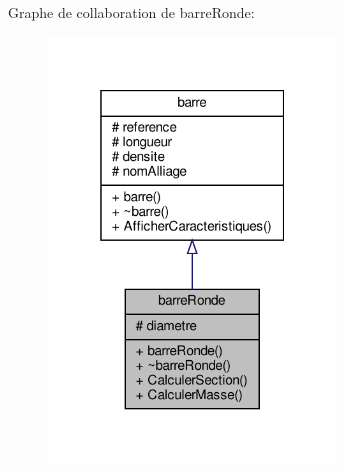 Graphe de collaboration de barre\+Ronde\+:
\nopagebreak
\begin{figure}[H]
\begin{center}
\leavevmode
\includegraphics[width=217pt]{classbarre_ronde__coll__graph}
\end{center}
\end{figure}

